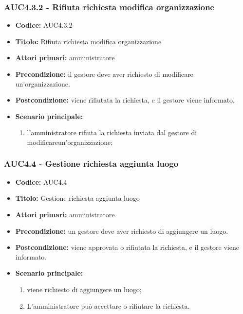 \documentclass[casi-duso]{subfiles}
\begin{document}
\subsubsection{AUC4.3.2 - Rifiuta richiesta modifica organizzazione}%
\label{subsub:AUC4.3.2}
\begin{itemize}
  \item \textbf{Codice:} AUC4.3.2
  \item \textbf{Titolo:} Rifiuta richiesta modifica organizzazione
  \item \textbf{Attori primari:} amministratore
  \item \textbf{Precondizione:} il gestore deve aver richiesto di modificare un'organizzazione.
  \item \textbf{Postcondizione:} viene rifiutata la richiesta, e il gestore viene informato.
  \item \textbf{Scenario principale:}
  \begin{enumerate}
    \item l'amministratore rifiuta la richiesta inviata dal gestore di modificareun'organizzazione;
  \end{enumerate}
\end{itemize}

\subsubsection{AUC4.4 - Gestione richiesta aggiunta luogo}%
\label{subsub:AUC4.4}
\begin{itemize}
  \item \textbf{Codice:} AUC4.4
  \item \textbf{Titolo:} Gestione richiesta aggiunta luogo
  \item \textbf{Attori primari:} amministratore
  \item \textbf{Precondizione:} un gestore deve aver richiesto di aggiungere un luogo.
  \item \textbf{Postcondizione:} viene approvata o rifiutata la richiesta, e il gestore viene informato.
  \item \textbf{Scenario principale:}
  \begin{enumerate}
    \item viene richiesto di aggiungere un luogo;
    \item L'amministratore può accettare o rifiutare la richiesta.
  \end{enumerate}
\end{itemize}
\end{document}

